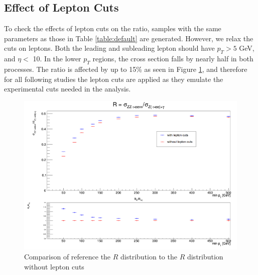 \documentclass[11pt,a4paper,final]{report}
\begin{document}
\subsection{Effect of Lepton Cuts}
To check the effects of lepton cuts on the ratio, samples with the same parameters as those in Table \ref{table:default} are generated. However, we relax the cuts on leptons. Both the leading and subleading lepton should have $p_T > 5$ GeV, and $\eta <$ 10. In the lower $p_T$ regions, the cross section falls by nearly half in both processes. The ratio is affected by up to 15\% as seen in Figure \ref{fig:lepcut}, and therefore for all following studies the lepton cuts are applied as they emulate the experimental cuts needed in the analysis.
\begin{figure}[H]
\centering
	\includegraphics[width = 0.8\linewidth]{lep_cuts.png}
	\caption{Comparison of reference the $R$ distribution to the $R$ distribution without lepton cuts}
	\label{fig:lepcut}
\end{figure}
\end{document}
